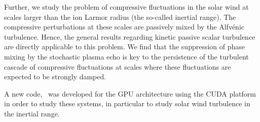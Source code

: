 Further, we study the problem of compressive fluctuations in the solar wind at scales
larger than the ion Larmor radius (the so-called inertial range). The compressive
perturbations at these scales are passively mixed by the Alfv\'{e}nic turbulence. Hence, the general results
regarding kinetic passive scalar turbulence are directly applicable to this problem. We
find that the suppression of phase mixing by the stochastic plasma echo is key to the persistence of
the turbulent cascade of compressive fluctuations at scales where these
fluctuations are expected to be strongly damped.

A new code, \Gand\ was developed for the GPU architecture using the CUDA platform in order to study
these systems, in particular to study solar wind turbulence
in the inertial range. 
